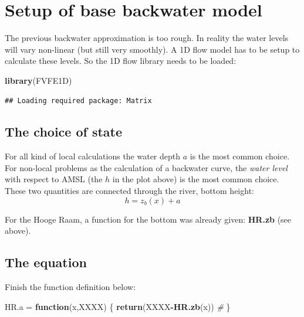 \documentclass[
]{article}
\newenvironment{Shaded}{\begin{snugshade}}{\end{snugshade}}
\newcommand{\CommentTok}[1]{\textcolor[rgb]{0.56,0.35,0.01}{\textit{#1}}}
\newcommand{\ControlFlowTok}[1]{\textcolor[rgb]{0.13,0.29,0.53}{\textbf{#1}}}
\newcommand{\FunctionTok}[1]{\textcolor[rgb]{0.13,0.29,0.53}{\textbf{#1}}}
\newcommand{\NormalTok}[1]{#1}
\newcommand{\OtherTok}[1]{\textcolor[rgb]{0.56,0.35,0.01}{#1}}
\newcommand{\SpecialCharTok}[1]{\textcolor[rgb]{0.81,0.36,0.00}{\textbf{#1}}}
\begin{document}
\hypertarget{setup-of-base-backwater-model}{%
\section{Setup of base backwater
model}\label{setup-of-base-backwater-model}}

The previous backwater approximation is too rough. In reality the water
levels will vary non-linear (but still very smoothly). A 1D flow model
has to be setup to calculate these levels. So the 1D flow library needs
to be loaded:

\begin{Shaded}
\begin{Highlighting}[]
\FunctionTok{library}\NormalTok{(FVFE1D)}
\end{Highlighting}
\end{Shaded}

\begin{verbatim}
## Loading required package: Matrix
\end{verbatim}

\hypertarget{the-choice-of-state}{%
\subsection{The choice of state}\label{the-choice-of-state}}

For all kind of local calculations the water depth \(a\) is the most
common choice. For non-local problems as the calculation of a backwater
curve, the \emph{water level} with respect to AMSL (the \(h\) in the
plot above) is the most common choice. These two quantities are
connected through the river, bottom height:\\
\[
  h = z_b(x)+a 
\]

For the Hooge Raam, a function for the bottom was already given:
\textbf{HR.zb} (see above).

\hypertarget{the-equation}{%
\subsection{The equation}\label{the-equation}}

Finish the function definition below:

\begin{Shaded}
\begin{Highlighting}[]
\NormalTok{HR.a }\OtherTok{=} \ControlFlowTok{function}\NormalTok{(x,XXXX)}
\NormalTok{\{}
  \FunctionTok{return}\NormalTok{(XXXX}\SpecialCharTok{{-}}\FunctionTok{HR.zb}\NormalTok{(x)) }\CommentTok{\#}
\NormalTok{\}}
\end{Highlighting}
\end{Shaded}
\end{document}
